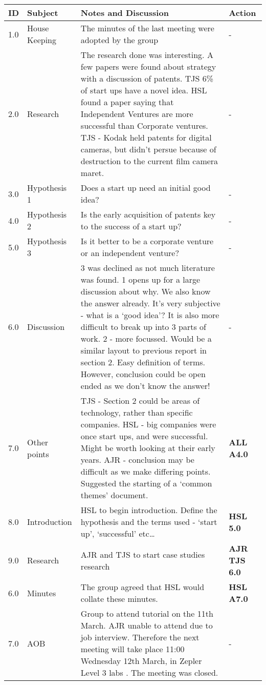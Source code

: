 \begin{center}
\begin{longtable}{| p{} |>{\raggedright\arraybackslash}p{} | p{} |>{\raggedright\arraybackslash}p{}|} \hline
\textbf{ID} & \textbf{Subject} & \textbf{Notes and Discussion} & \textbf{Action} \\ \hline
\endhead
1.0	&	House Keeping	&	The minutes of the last meeting were adopted by the group								&	- \\ \hline
2.0 	&	Research	&	The research done was interesting. A few papers were found about strategy with a discussion of patents. TJS 6\% of start ups have a novel idea. HSL found a paper saying that Independent Ventures are more successful than Corporate ventures. TJS - Kodak held patents for digital cameras, but didn't persue because of destruction to the current film camera maret.  & - \\ \hline
3.0	&	Hypothesis 1 	& 	Does a start up need an initial good idea?	& - \\ \hline
4.0 	&	Hypothesis 2 	&	Is the early acquisition of patents key to the success of a start up? & - \\ \hline
5.0	&	Hypothesis 3	&	Is it better to be a corporate venture or an independent venture? & - \\ \hline
6.0	&	Discussion	& 	3 was declined as not much literature was found. 1 opens up for a large discussion about why. We also know the answer already. It's very subjective - what is a `good idea'? It is also more difficult to break up into 3 parts of work. 2 - more focussed. Would be a similar layout to previous report in section 2. Easy definition of terms. However, conclusion could be open ended as we don't know the answer! & - \\ \hline
7.0	&	Other points	&	TJS - Section 2 could be areas of technology, rather than specific companies. HSL - big companies were once start ups, and were successful. Might be worth looking at their early years. AJR - conclusion may be difficult as we make differing points. Suggested the starting of a `common themes' document. & \textbf{ALL A4.0} \\ \hline
8.0	& 	Introduction	&	HSL to begin introduction. Define the hypothesis and the terms used - `start up', `successful' etc\dots & \textbf{HSL 5.0} \\ \hline
9.0	&	Research	&	AJR and TJS to start case studies research & \textbf{AJR TJS 6.0} \\ \hline
6.0	&	Minutes		&	The group agreed that HSL would collate these minutes.			& \textbf{HSL A7.0} \\ \hline
7.0	&	AOB		&	Group to attend tutorial on the 11th March. AJR unable to attend due to job interview. Therefore the next meeting will take place 11:00 Wednesday 12th March, in Zepler Level 3 labs . The meeting was closed. & - \\ \hline

\end{longtable}
\end{center}

